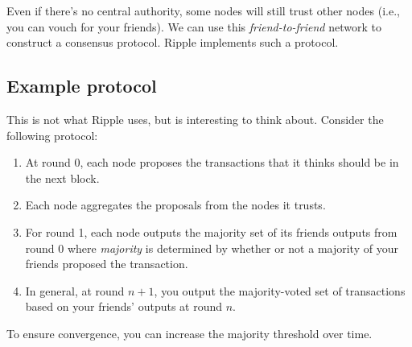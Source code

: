 \documentclass[12pt]{article}
\begin{document}
Even if there's no central authority, some nodes will still trust other nodes (i.e., you can vouch for your friends). We can use this \textit{friend-to-friend} network to construct a consensus protocol. Ripple implements such a protocol.

\subsection*{Example protocol}

This is not what Ripple uses, but is interesting to think about. Consider the following protocol:

\begin{enumerate}
\item At round 0, each node proposes the transactions that it thinks should be in the next block.
\item Each node aggregates the proposals from the nodes it trusts.
\item For round 1, each node outputs the majority set of its friends outputs from round 0 where \textit{majority} is determined by whether or not a majority of your friends proposed the transaction.
\item In general, at round $n+1$, you output the majority-voted set of transactions based on your friends' outputs at round $n$.
\end{enumerate}

To ensure convergence, you can increase the majority threshold over time.
\end{document}
